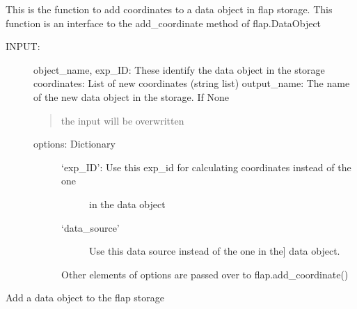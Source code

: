 \documentclass[letterpaper,10pt,english]{sphinxmanual}
\begin{document}

\begin{fulllineitems}
\label{\detokenize{data_object:flap.data_object.add_coordinate}}
This is the function to add coordinates to a data object in flap storage.
This function is an interface to the add\_coordinate method of flap.DataObject
\begin{description}
\item[{INPUT:}] \leavevmode
object\_name, exp\_ID: These identify the data object in the storage
coordinates: List of new coordinates (string list)
output\_name: The name of the new data object in the storage. If None
\begin{quote}

the input will be overwritten
\end{quote}
\begin{description}
\item[{options: Dictionary}] \leavevmode\begin{description}
\item[{‘exp\_ID’: Use this exp\_id for calculating coordinates instead of the one}] \leavevmode
in the data object

\item[{‘data\_source’}] \leavevmode{[}Use this data source instead of the one in the{]}
data object.

\end{description}

Other elements of options are passed over to flap.add\_coordinate()

\end{description}

\end{description}

\end{fulllineitems}


\begin{fulllineitems}
\label{\detokenize{data_object:flap.data_object.add_data_object}}
Add a data object to the flap storage

\end{fulllineitems}
\end{document}

